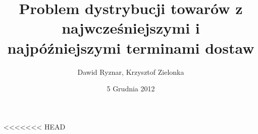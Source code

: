 \documentclass{beamer}
\title{Problem dystrybucji towarów z najwcześniejszymi i najpóźniejszymi terminami dostaw}
\author{Dawid Ryznar, Krzysztof Zielonka}
\date{5 Grudnia 2012}
\begin{document}
\frame{\titlepage}



















<<<<<<< HEAD
\end{document}
